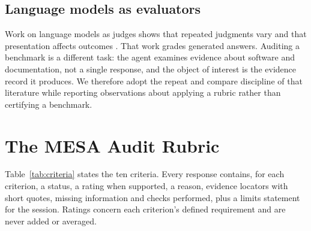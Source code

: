 \documentclass[10pt,conference]{IEEEtran}
\begin{document}
\subsection{Language models as evaluators}
Work on language models as judges shows that repeated judgments vary and that presentation affects outcomes \cite{zheng_llm_judge_2023,shi_judging_judges_2025}. That work grades generated answers. Auditing a benchmark is a different task: the agent examines evidence about software and documentation, not a single response, and the object of interest is the evidence record it produces. We therefore adopt the repeat and compare discipline of that literature while reporting observations about applying a rubric rather than certifying a benchmark.

\section{The MESA Audit Rubric}
Table~\ref{tab:criteria} states the ten criteria. Every response contains, for each criterion, a status, a rating when supported, a reason, evidence locators with short quotes, missing information and checks performed, plus a limits statement for the session. Ratings concern each criterion's defined requirement and are never added or averaged.
\end{document}
